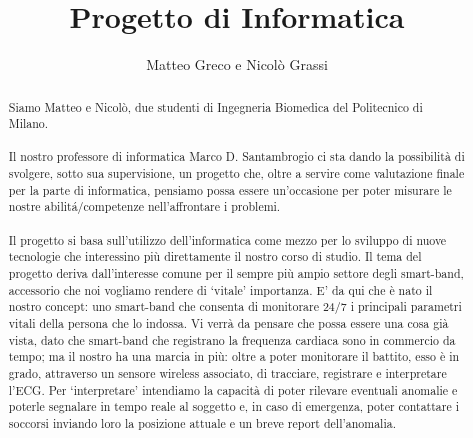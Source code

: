\documentclass[a4paper, 12pt]{article}
\author{Matteo Greco e Nicol\`o Grassi}
\title{\bf{Progetto di Informatica}}
\date{}
\begin{document}
\maketitle
\begin{abstract}
Siamo Matteo e Nicol\`o, due studenti di Ingegneria Biomedica del Politecnico di Milano.\\\\Il nostro professore di informatica Marco D. Santambrogio ci sta dando la possibilit\`a di svolgere, sotto sua supervisione, un progetto che, oltre a servire come valutazione finale per la parte di informatica, pensiamo possa essere un'occasione per poter misurare le nostre abilit\'a/competenze nell'affrontare i problemi.\\\\
Il progetto si basa sull'utilizzo dell'informatica come mezzo per lo sviluppo di nuove tecnologie che interessino pi\`u direttamente il nostro corso di studio.
Il tema del progetto deriva dall'interesse comune per il sempre pi\`u ampio settore degli smart-band, accessorio che noi vogliamo rendere di `vitale' importanza. E' da qui che \`e nato il nostro concept: uno smart-band che consenta di monitorare 24/7 i principali parametri vitali della persona che lo indossa. Vi verr\`a da pensare che possa essere una cosa gi\`a vista, dato che smart-band che registrano la frequenza cardiaca sono in commercio da tempo; ma il nostro ha una marcia in pi\`u: oltre a poter monitorare il battito, esso \`e in grado, attraverso un sensore wireless associato, di tracciare, registrare e interpretare l'ECG. Per `interpretare'  intendiamo la capacit\`a di poter rilevare eventuali anomalie e poterle segnalare in tempo reale al soggetto e, in caso di emergenza, poter contattare i soccorsi inviando loro la posizione attuale e un breve report dell'anomalia.
\end{abstract}
\newpage
\end{document}
